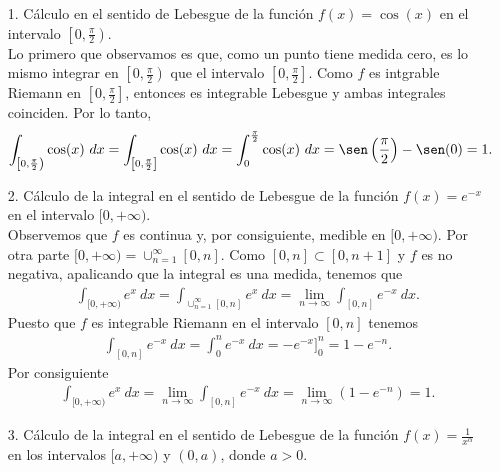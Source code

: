 \begin{ejemplo}
\begin{enumerate}
    \item[1.] Cálculo en el sentido de Lebesgue de la función $f(x) = \cos(x)$ en el intervalo $\left[0,\frac{\pi}{2}\right)$.
    \\
    \newline
    Lo primero que observamos es que, como un punto tiene medida cero, es lo mismo integrar en $\left[0,\frac{\pi}{2}\right)$ que el intervalo $\left[0,\frac{\pi}{2}\right]$. Como $f$ es intgrable Riemann en $\left[0,\frac{\pi}{2}\right]$, entonces es integrable Lebesgue y ambas integrales coinciden. Por lo tanto,
    \begin{align*}
        \int_{\left[0,\frac{\pi}{2}\right)}{\cos(x) \ dx} = \int_{\left[0,\frac{\pi}{2}\right]}{\cos(x) \ dx} = \int_{0}^{\frac{\pi}{2}}{\cos(x) \ dx} = \sen\left(\frac{\pi}{2}\right) - \sen(0) = 1.
    \end{align*}
    \item[2.] Cálculo de la integral en el sentido de Lebesgue de la función $f(x) = e^{-x}$ en el intervalo $[0,+\infty)$. 
    \\
    \newline
    Observemos que $f$ es continua y, por consiguiente, medible en $[0,+\infty)$. Por otra parte $[0,+\infty) = \cup_{n=1}^{\infty}{[0,n]}$. Como $[0,n] \subset [0,n+1]$ y $f$ es no negativa, apalicando que la integral es una medida, tenemos que
    \begin{align*}
        \int_{[0,+\infty)}{e^{x} \ dx} = \int_{\cup_{n=1}^{\infty}{[0,n]}}{e^{x} \ dx} = \lim_{n \to \infty}{\int_{[0,n]}{e^{-x} \ dx}}.
    \end{align*}
    Puesto que $f$ es integrable Riemann en el intervalo $[0,n]$ tenemos
    \begin{align*}
        {\int_{[0,n]}{e^{-x} \ dx}} = \int_{0}^{n}{e^{-x} \ dx} = -e^{-x}]_0^n = 1 - e^{-n}.
    \end{align*}
    Por consiguiente
    \begin{align*}
         \int_{[0,+\infty)}{e^{x} \ dx} = \lim_{n \to \infty}{\int_{[0,n]}{e^{-x} \ dx}} = \lim_{n \to \infty}{(1 - e^{-n})} = 1.
    \end{align*}
    \item[3.] Cálculo de la integral en el sentido de Lebesgue de la función $f(x) = \frac{1}{x^{\alpha}}$ en los intervalos $[a,+\infty)$ y $(0,a)$, donde $a > 0$.
    \\
    \newline

\end{enumerate}
\end{ejemplo}
